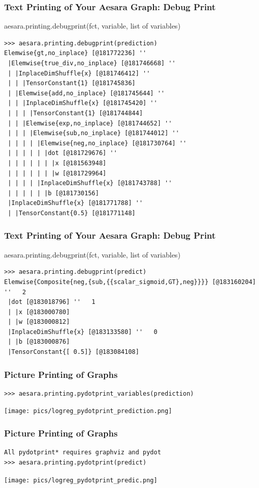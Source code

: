 \documentclass[a4paper,9pt]{beamer}
\begin{document}
\begin{frame}[fragile]
\frametitle{Text Printing of Your Aesara Graph: Debug Print}
aesara.printing.debugprint({fct, variable, list of variables})
\vfill
\small
\begin{Verbatim}
>>> aesara.printing.debugprint(prediction)
Elemwise{gt,no_inplace} [@181772236] ''
 |Elemwise{true_div,no_inplace} [@181746668] ''
 | |InplaceDimShuffle{x} [@181746412] ''
 | | |TensorConstant{1} [@181745836]
 | |Elemwise{add,no_inplace} [@181745644] ''
 | | |InplaceDimShuffle{x} [@181745420] ''
 | | | |TensorConstant{1} [@181744844]
 | | |Elemwise{exp,no_inplace} [@181744652] ''
 | | | |Elemwise{sub,no_inplace} [@181744012] ''
 | | | | |Elemwise{neg,no_inplace} [@181730764] ''
 | | | | | |dot [@181729676] ''
 | | | | | | |x [@181563948]
 | | | | | | |w [@181729964]
 | | | | |InplaceDimShuffle{x} [@181743788] ''
 | | | | | |b [@181730156]
 |InplaceDimShuffle{x} [@181771788] ''
 | |TensorConstant{0.5} [@181771148]
\end{Verbatim}
\end{frame}

\begin{frame}[fragile]
\frametitle{Text Printing of Your Aesara Graph: Debug Print}
aesara.printing.debugprint({fct, variable, list of variables})
\vfill
\small
\begin{Verbatim}
>>> aesara.printing.debugprint(predict)
Elemwise{Composite{neg,{sub,{{scalar_sigmoid,GT},neg}}}} [@183160204] ''   2
 |dot [@183018796] ''   1
 | |x [@183000780]
 | |w [@183000812]
 |InplaceDimShuffle{x} [@183133580] ''   0
 | |b [@183000876]
 |TensorConstant{[ 0.5]} [@183084108]
\end{Verbatim}
\end{frame}

\begin{frame}[fragile]
\frametitle{Picture Printing of Graphs}
\begin{Verbatim}
>>> aesara.printing.pydotprint_variables(prediction)
\end{Verbatim}
\texttt{[image: pics/logreg\_pydotprint\_prediction.png]}
\end{frame}

\begin{frame}[fragile]
\frametitle{Picture Printing of Graphs}
\begin{Verbatim}
All pydotprint* requires graphviz and pydot
>>> aesara.printing.pydotprint(predict)
\end{Verbatim}
\texttt{[image: pics/logreg\_pydotprint\_predic.png]}
\end{frame}
\end{document}
